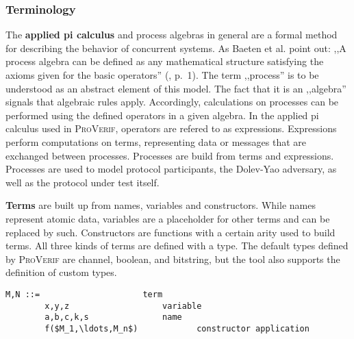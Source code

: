 \subsubsection{Terminology}

The \textbf{applied pi calculus} and process algebras in general are a formal method for describing the behavior of concurrent systems.
As Baeten et al. point out: ,,A process algebra can be defined as any mathematical structure satisfying the axioms given for the basic operators'' (\cite{baeten2007process}, p.~1).
The term ,,process'' is to be understood as an abstract element of this model.
The fact that it is an ,,algebra'' signals that algebraic rules apply.
Accordingly, calculations on processes can be performed using the defined operators in a given algebra.
In the applied pi calculus used in \textsc{ProVerif}, operators are refered to as expressions.
Expressions perform computations on terms, representing data or messages that are exchanged between processes.
Processes are build from terms and expressions.
Processes are used to model protocol participants, the Dolev-Yao adversary, as well as the protocol under test itself.

\textbf{Terms} are built up from names, variables and constructors.
While names represent atomic data, variables are a placeholder for other terms and can be replaced by such.
Constructors are functions with a certain arity used to build terms.
All three kinds of terms are defined with a type.
The default types defined by \textsc{ProVerif} are \textsf{channel}, \textsf{boolean}, and \textsf{bitstring}, but the tool also supports the definition of custom types.


\begin{lstlisting}[caption={ProVerif term grammar, according to \cite{blanchet2016modeling}, p.~13},label={lst:pv-terms}]
    M,N ::=                     term
        x,y,z                   variable
        a,b,c,k,s               name
        f($M_1,\ldots,M_n$)            constructor application
\end{lstlisting}

